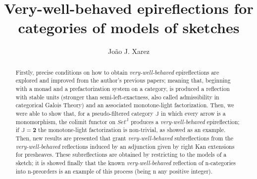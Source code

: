 \documentclass[12pt,a4paper]{amsart}
\theoremstyle{definition}
\begin{document}
\title[Epireflections for models of sketches]{Very-well-behaved epireflections for categories of models of sketches}

 \author[Jo\~{a}o J. Xarez]{Jo\~{a}o J. Xarez}



 \address{CIDMA - Center for Research and Development in Mathematics and Applications,
Department of Mathematics, University of Aveiro, 3810-193 Aveiro, Portugal}





\begin{abstract}
Firstly, precise conditions on how to obtain \emph{very-well-behaved} epireflections are explored and improved from the author's previous papers; meaning that, beginning with a monad and a prefactorization system on a category, is produced a reflection with stable units (stronger than semi-left-exactness, also called admissibility in categorical Galois Theory) and an associated monotone-light factorization. Then, we were able to show that, for a pseudo-filtered category $\mathbb{J}$ in which every arrow is a monomorphism, the colimit functor on $Set^\mathbb{J}$ produces a \emph{very-well-behaved} epireflection; if $\mathbb{J}=\mathbf{2}$ the monotone-light factorization is non-trivial, as showed as an example. Then, new results are presented that grant \emph{very-well-behaved} subreflections from the \emph{\emph{very-well-behaved}} reflections induced by an adjunction given by right Kan extensions for presheaves. These subreflections are obtained by restricting to the models of a sketch; it is showed finally that the known \emph{very-well-behaved} reflection of n-categories into n-preorders is an example of this process (being n any positive integer).
\end{abstract}

\maketitle
\end{document}
